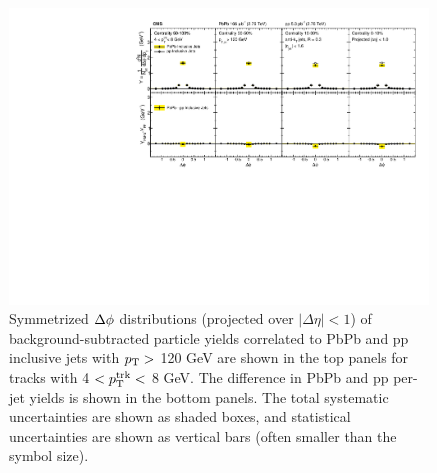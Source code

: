 \begin{figure}[hbt] 
\begin{center} 
\includegraphics[width=0.99\textwidth]{figures/Results/PAS_Figure_4_TrkPt4_TrkPt8.pdf}
\caption[Inclusive jet $\Delta\phi$ correlations for tracks with $4 < p_{\rm T}^{\rm trk} < 8$ GeV at 2.76 TeV]{Symmetrized $\protect\Delta\phi$ distributions  (projected over $|\Delta\eta| < 1$) of background-subtracted particle yields correlated to PbPb and pp inclusive jets with $p_{\rm T} >$ 120 GeV are shown in the top panels for tracks with 4 $ < p_{\rm T}^{\rm trk} < $ 8 GeV.  The difference in PbPb and pp per-jet yields is shown in the bottom panels. The total systematic uncertainties are shown as shaded boxes, and statistical uncertainties are shown as vertical bars (often smaller than the symbol size).}
\label{fig:Inclusive_dPhi4} 
\end{center} 
\end{figure} 

